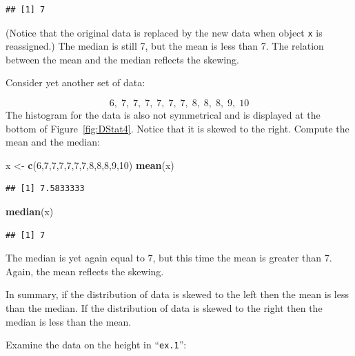 \documentclass[]{krantz}
\makeatletter
\newenvironment{Shaded}{\begin{snugshade}}{\end{snugshade}}
\newcommand{\KeywordTok}[1]{\textcolor[rgb]{0.13,0.29,0.53}{\textbf{#1}}}
\newcommand{\DecValTok}[1]{\textcolor[rgb]{0.00,0.00,0.81}{#1}}
\newcommand{\StringTok}[1]{\textcolor[rgb]{0.31,0.60,0.02}{#1}}
\newcommand{\OperatorTok}[1]{\textcolor[rgb]{0.81,0.36,0.00}{\textbf{#1}}}
\newcommand{\NormalTok}[1]{#1}
\newenvironment{kframe}{%
\medskip{}
\setlength{\fboxsep}{.8em}
 \def\at@end@of@kframe{}%
 \ifinner\ifhmode%
  \def\at@end@of@kframe{\end{minipage}}%
  \begin{minipage}{\columnwidth}%
 \fi\fi%
 \def\FrameCommand##1{\hskip\@totalleftmargin \hskip-\fboxsep
 \colorbox{shadecolor}{##1}\hskip-\fboxsep
     \hskip-\linewidth \hskip-\@totalleftmargin \hskip\columnwidth}%
 \MakeFramed {\advance\hsize-\width
   \@totalleftmargin\z@ \linewidth\hsize
   \@setminipage}}%
 {\par\unskip\endMakeFramed%
 \at@end@of@kframe}
\renewenvironment{Shaded}{\begin{kframe}}{\end{kframe}}
\theoremstyle{definition}
\theoremstyle{definition}
\theoremstyle{definition}
\theoremstyle{remark}
\makeatother
\begin{document}
\begin{verbatim}
## [1] 7
\end{verbatim}

(Notice that the original data is replaced by the new data when object
\texttt{x} is reassigned.) The median is still 7, but the mean is less
than 7. The relation between the mean and the median reflects the
skewing.

Consider yet another set of data:

\[6,\;  7,\;  7,\;  7,\;  7,\;  7,\;  7,\;  8,\;  8,\;  8,\;  9,\;  10\]
The histogram for the data is also not symmetrical and is displayed at
the bottom of Figure~\ref{fig:DStat4}. Notice that it is skewed to the
right. Compute the mean and the median:

\begin{Shaded}
\begin{Highlighting}[]
\NormalTok{x <-}\StringTok{ }\KeywordTok{c}\NormalTok{(}\DecValTok{6}\NormalTok{,}\DecValTok{7}\NormalTok{,}\DecValTok{7}\NormalTok{,}\DecValTok{7}\NormalTok{,}\DecValTok{7}\NormalTok{,}\DecValTok{7}\NormalTok{,}\DecValTok{7}\NormalTok{,}\DecValTok{8}\NormalTok{,}\DecValTok{8}\NormalTok{,}\DecValTok{8}\NormalTok{,}\DecValTok{9}\NormalTok{,}\DecValTok{10}\NormalTok{)}
\KeywordTok{mean}\NormalTok{(x)}
\end{Highlighting}
\end{Shaded}

\begin{verbatim}
## [1] 7.5833333
\end{verbatim}

\begin{Shaded}
\begin{Highlighting}[]
\KeywordTok{median}\NormalTok{(x)}
\end{Highlighting}
\end{Shaded}

\begin{verbatim}
## [1] 7
\end{verbatim}

The median is yet again equal to 7, but this time the mean is greater
than 7. Again, the mean reflects the skewing.

In summary, if the distribution of data is skewed to the left then the
mean is less than the median. If the distribution of data is skewed to
the right then the median is less than the mean.

Examine the data on the height in ``\texttt{ex.1}'':

\begin{Shaded}
\end{Shaded}
\end{document}
